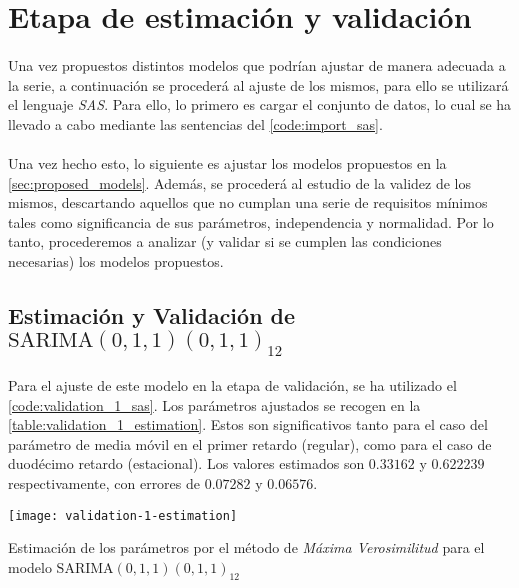\documentclass[a4paper, spanish]{article}
\begin{document}
  \section{Etapa de estimación y validación}
  \label{sec:fitting}

    \paragraph{}
    Una vez propuestos distintos modelos que podrían ajustar de manera adecuada a la serie, a continuación se procederá al ajuste de los mismos, para ello se utilizará el lenguaje \emph{SAS}. Para ello, lo primero es cargar el conjunto de datos, lo cual se ha llevado a cabo mediante las sentencias del \autoref{code:import_sas}.

    \paragraph{}
    Una vez hecho esto, lo siguiente es ajustar los modelos propuestos en la \autoref{sec:proposed_models}. Además, se procederá al estudio de la validez de los mismos, descartando aquellos que no cumplan una serie de requisitos mínimos tales como significancia de sus parámetros, independencia y normalidad. Por lo tanto, procederemos a analizar (y validar si se cumplen las condiciones necesarias) los modelos propuestos.

    \subsection{Estimación y Validación de \textbf{$\text{SARIMA}(0, 1, 1)(0, 1, 1)_{12}$}}
    \label{sec:fitting_1}

      \paragraph{}
      Para el ajuste de este modelo en la etapa de validación, se ha utilizado el \autoref{code:validation_1_sas}. Los parámetros ajustados se recogen en la \autoref{table:validation_1_estimation}. Estos son significativos tanto para el caso del parámetro de media móvil en el primer retardo (regular), como para el caso de duodécimo retardo (estacional). Los valores estimados son $0.33162$ y $0.622239$ respectivamente, con errores de $0.07282$ y $0.06576$.

      \begin{table}[htb!]
        \centering
        \texttt{[image: validation-1-estimation]}
        \caption{Estimación de los parámetros por el método de \emph{Máxima Verosimilitud} para el modelo $\text{SARIMA}(0, 1, 1)(0, 1, 1)_{12}$}
        \label{table:validation_1_estimation}
      \end{table}
\end{document}
